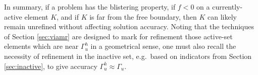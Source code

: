 \documentclass[]{interact}
\theoremstyle{plain}%
\theoremstyle{definition}
\theoremstyle{remark}
\begin{document}
In summary, if a problem has the blistering property, if $f < 0$ on a currently-active element $K$, and if $K$ is far from the free boundary, then $K$ can likely remain unrefined without affecting solution accuracy.  Noting that the techniques of Section \ref{sec:viamr} are designed to mark for refinement those active-set elements which are near $\Gamma_u^h$ in a geometrical sense, one must also recall the necessity of refinement in the inactive set, e.g.~based on indicators from Section \ref{sec:inactive}, to give accuracy $\Gamma_u^h \approx \Gamma_u$.
\end{document}
